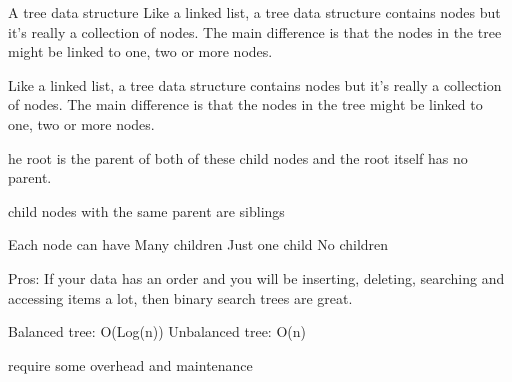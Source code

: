 A tree data structure 
  Like a linked list, a tree data structure contains nodes but it's really a collection of nodes. 
  The main difference is that the nodes in the tree might be linked to one, two or more nodes.

  Like a linked list, a tree data structure contains nodes but it's really a collection of nodes. 
  The main difference is that the nodes in the tree might be linked to one, two or more nodes.  

  he root is the parent of both of these child nodes and the root itself has no parent.

  child nodes with the same parent are siblings 

  Each node can have 
    Many children 
    Just one child 
    No children 

Pros: 
  If your data has an order and you will be inserting, deleting, searching and accessing items a lot, then binary search trees are great. 

  Balanced tree:
    O(Log(n))
  Unbalanced tree: 
    O(n)

  require some overhead and maintenance